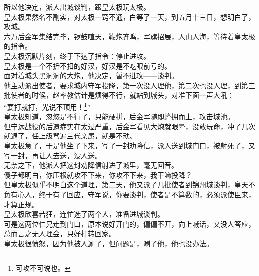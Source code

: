 \begin{multicols}{\theparacolNo}
所以他决定，派人出城谈判，跟皇太极玩太极。\\

皇太极果然名不副实，对太极一窍不通，白等了一天，到五月十三日，想明白了，攻城。\\

六万后金军集结完毕，锣鼓喧天，鞭炮齐鸣，军旗招展，人山人海，等待着皇太极的指令。\\

皇太极沉默片刻，终于下达了指令：停止进攻。\\

皇太极是一个不折不扣的好汉，好汉是不吃眼前亏的。\\

面对着城头黑洞洞的大炮，他决定，暂不进攻——谈判。\\

他主动派出使者，要求城内守军投降，第一次没人理他，第二次也没人理，到第三批使者的时候，赵率教估计是烦得不行，就站到城头，对准下面一声大吼：\\

“要打就打，光说不顶用！\footnote{可攻不可说也。}”\\

皇太极知道，忽悠是不行了，只能硬拼，后金军随即蜂拥而上，攻击城池。\\

但宁远战役的后遗症实在太过严重，后金军看见大炮就眼晕，没敢玩命，冲了几次就退了，任上级骂遍三代亲属，就是不动。\\

皇太极急了，于是他坐了下来，写了一封劝降信，派人送到城门口，被射死了，又写一封，再让人去送，没人送。\\

无奈之下，他派人把这封劝降信射进了城里，毫无回音。\\

傻子都明白，你压根就攻不下来，你攻不下来，我干嘛投降？\\

但皇太极似乎不明白这个道理，第二天，他又派了几批使者到锦州城谈判，皇天不负有心人，终于有了回应，守军说，你要谈判，使者是不算数的，必须派使臣来，才算正规。\\

皇太极欣喜若狂，连忙选了两个人，准备进城谈判。\\

可是这两位仁兄走到门口，原本说好开门的，偏偏不开，向上喊话，又没人答应，总而言之无人理会，只好打转回家。\\

皇太极很愤怒，因为他被人涮了，但问题是，涮了他，他也没办法。\\


\end{multicols}
